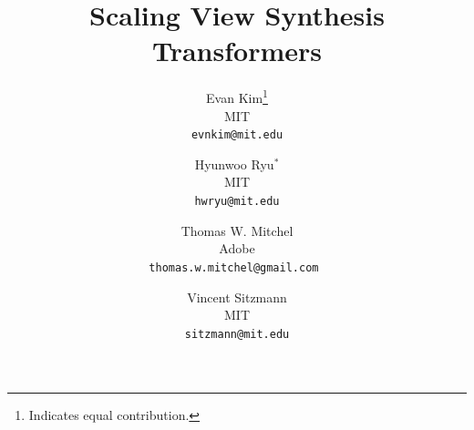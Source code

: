 \documentclass[10pt,twocolumn,letterpaper]{article}
\title{Scaling View Synthesis Transformers}
\author{
Evan Kim\thanks{Indicates equal contribution.}\\
MIT\\
{\tt\small evnkim@mit.edu}
\and
Hyunwoo Ryu$^*$\\
MIT\\
{\tt\small hwryu@mit.edu}
\and
Thomas W. Mitchel\\
Adobe\\
{\tt\small thomas.w.mitchel@gmail.com }
\and
Vincent Sitzmann\\
MIT\\
{\tt\small sitzmann@mit.edu}
}
\begin{document}
\maketitle
    







{
    \small
    
    
}


\end{document}
